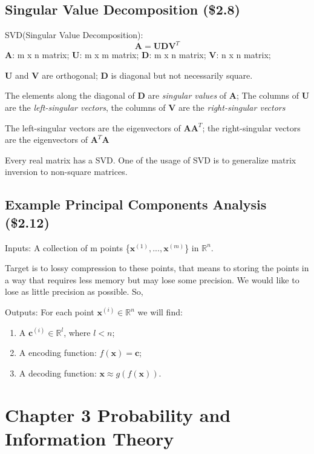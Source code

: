 \documentclass[12pt]{article}
\numberwithin{equation}{section}
\begin{document}
\subsection{Singular Value Decomposition (\$2.8)}
SVD(Singular Value Decomposition):
\begin{equation}
	\mathbf{A=UDV}^{T}
\end{equation}
\textbf{A}: m x n matrix; \textbf{U}: m x m matrix; \textbf{D}: m x n matrix;  \textbf{V}: n x n matrix; \par
\textbf{U} and \textbf{V} are orthogonal; \textbf{D} is diagonal but not necessarily square.\par
The elements along the diagonal of \textbf{D} are \emph{singular values} of \textbf{A};
The columns of \textbf{U} are the \emph{left-singular vectors}, the columns of \textbf{V} are the \emph{right-singular vectors} \par
The left-singular vectors are the eigenvectors of $\mathbf{AA}^T$; the right-singular vectors are the eigenvectors of $\mathbf{A}^T\mathbf{A}$ \par
Every real matrix has a SVD. One of the usage of SVD is to generalize matrix inversion to non-square matrices.
\subsection{Example Principal Components Analysis (\$2.12)}
Inputs: A collection of m points \{$\mathbf{x}^{(1)},...,\mathbf{x}^{(m)}$\} in $\mathbb{R}^{n}$. \par
Target is to lossy compression to these points, that means to storing the points in a way that requires less memory but may lose some precision. We would like to lose as little precision as possible. So, \par
Outputs: For each point $\mathbf{x}^{(i)} \in \mathbb{R}^{n}$ we will find:
\begin{enumerate}
	\item A $\mathbf{c}^{(i)} \in \mathbb{R}^{l}$, where $l < n$;
	\item A encoding function: $f(\mathbf{x})=\mathbf{c}$; 
	\item A decoding function: $\mathbf{x} \approx g(f(\mathbf{x}))$.
\end{enumerate}
\section{Chapter 3 Probability and Information Theory}
\end{document}
